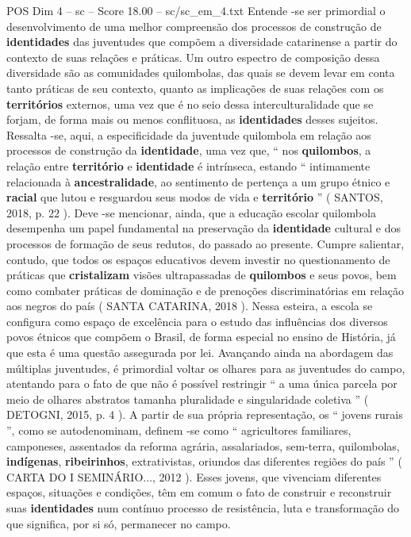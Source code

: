 \begin{textsample}{POS Dim 4 – sc – Score 18.00 – sc/sc\_em\_4.txt}
Entende -se ser primordial o desenvolvimento de uma melhor compreensão dos processos de construção de \textbf{identidades} das juventudes que compõem a diversidade catarinense a partir do contexto de suas relações e práticas.
Um outro espectro de composição dessa diversidade são as comunidades quilombolas, das quais se devem levar em conta tanto práticas de seu contexto, quanto as implicações de suas relações com os \textbf{territórios} externos, uma vez que é no seio dessa interculturalidade que se forjam, de forma mais ou menos conflituosa, as \textbf{identidades} desses sujeitos.
Ressalta -se, aqui, a especificidade da juventude quilombola em relação aos processos de construção da \textbf{identidade}, uma vez que, “ nos \textbf{quilombos}, a relação entre \textbf{território} e \textbf{identidade} é intrínseca, estando “ intimamente relacionada à \textbf{ancestralidade}, ao sentimento de pertença a um grupo étnico e \textbf{racial} que lutou e resguardou seus modos de vida e \textbf{território} ” ( SANTOS, 2018, p. 22 ).
Deve -se mencionar, ainda, que a educação escolar quilombola desempenha um papel fundamental na preservação da \textbf{identidade} cultural e dos processos de formação de seus redutos, do passado ao presente.
Cumpre salientar, contudo, que todos os espaços educativos devem investir no questionamento de práticas que \textbf{cristalizam} visões ultrapassadas de \textbf{quilombos} e seus povos, bem como combater práticas de dominação e de prenoções discriminatórias em relação aos negros do país ( SANTA CATARINA, 2018 ).
Nessa esteira, a escola se configura como espaço de excelência para o estudo das influências dos diversos povos étnicos que compõem o Brasil, de forma especial no ensino de História, já que esta é uma questão assegurada por lei.
Avançando ainda na abordagem das múltiplas juventudes, é primordial voltar os olhares para as juventudes do campo, atentando para o fato de que não é possível restringir “ a uma única parcela por meio de olhares abstratos tamanha pluralidade e singularidade coletiva ” ( DETOGNI, 2015, p. 4 ).
A partir de sua própria representação, os “ jovens rurais ”, como se autodenominam, definem -se como “ agricultores familiares, camponeses, assentados da reforma agrária, assalariados, sem-terra, quilombolas, \textbf{indígenas}, \textbf{ribeirinhos}, extrativistas, oriundos das diferentes regiões do país ” ( CARTA DO I SEMINÁRIO..., 2012 ).
Esses jovens, que vivenciam diferentes espaços, situações e condições, têm em comum o fato de construir e reconstruir suas \textbf{identidades} num contínuo processo de resistência, luta e transformação do que significa, por si só, permanecer no campo.

\end{textsample}
